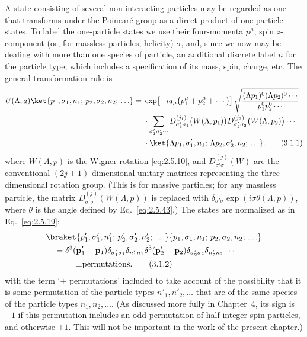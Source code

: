 A state consisting of several non-interacting particles may be regarded as
one that transforms under the Poincar\'e group as a
direct product of one-particle states. To label the one-particle states we use
their four-momenta $p^\mu$, spin $z$-component (or, for massless particles,
helicity) $\sigma$, and, since we now may be dealing with more than one
species of particle, an additional discrete label $n$ for the particle type,
which includes a specification of its mass, spin, charge, etc. The general
transformation rule is
\begin{align}
U(\Lambda,a)\ket{p_1,\sigma_1,n_1;\,p_2,\sigma_2,n_2;\,\ldots}
={}&\exp\!\left[-ia_\mu\bigl(p_1^\mu+p_2^\mu+\cdots\bigr)\right]
\sqrt{\frac{(\Lambda p_1)^0(\Lambda p_2)^0\cdots}{p_1^0p_2^0\cdots}}
\notag\\
&\cdot\sum_{\sigma'_1\sigma'_2\cdots}
D^{(j_1)}_{\sigma'_1\sigma_1}\bigl(W(\Lambda,p_1)\bigr)
D^{(j_2)}_{\sigma'_2\sigma_2}\bigl(W(\Lambda,p_2)\bigr)\cdots
\notag\\
&\cdot\ket{\Lambda p_1,\sigma'_1,n_1;\,
             \Lambda p_2,\sigma'_2,n_2;\,\ldots}.
\tag{3.1.1}\label{eq:3.1.1}
\end{align}
where $W(\Lambda,p)$ is the Wigner rotation \eqref{eq:2.5.10}, and
$D^{(j)}_{\sigma'\sigma}(W)$ are the conventional $(2j+1)$-dimensional
unitary matrices representing the three-dimensional rotation group. (This is
for massive particles; for any massless particle, the matrix
$D^{(j)}_{\sigma'\sigma}(W(\Lambda,p))$ is replaced with
$\delta_{\sigma'\sigma}\exp(i\sigma\theta(\Lambda,p))$, where $\theta$ is
the angle defined by Eq.~\eqref{eq:2.5.43}.) The states are normalized as in
Eq.~\eqref{eq:2.5.19}:
\begin{align}
&\braket{p'_1,\sigma'_1,n'_1;\,p'_2,\sigma'_2,n'_2;\,\ldots}
 {p_1,\sigma_1,n_1;\,p_2,\sigma_2,n_2;\,\ldots}
\notag\\
&\quad={}
\delta^3(\mathbf p'_1-\mathbf p_1)\delta_{\sigma'_1\sigma_1}
\delta_{n'_1n_1}
\delta^3(\mathbf p'_2-\mathbf p_2)\delta_{\sigma'_2\sigma_2}
\delta_{n'_2n_2}\cdots
\notag\\
&\qquad\mathrel{\phantom{={}}}\pm\text{permutations}.
\tag{3.1.2}\label{eq:3.1.2}
\end{align}
with the term `$\pm$ permutations' included to take account of the
possibility that it is some permutation of the particle types
$n'_1,n'_2,\ldots$ that are of the same species of the particle types
$n_1,n_2,\ldots$. (As discussed more fully in Chapter~4, its sign is $-1$
if this permutation includes an odd permutation of half-integer spin
particles, and otherwise $+1$. This will not be important in the work of the
present chapter.)


